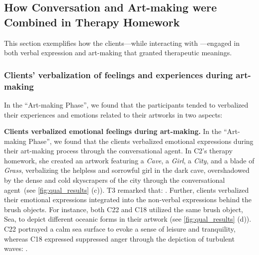 \subsection{How Conversation and Art-making were Combined in Therapy Homework}
This section exemplifies how the clients---while interacting with \name{}---engaged in both verbal expression and art-making that granted therapeutic meanings.



\subsubsection{\textbf{Clients' verbalization of feelings and experiences during art-making}}
In the ``Art-making Phase'', we found that the participants tended to verbalized their experiences and emotions related to their artworks in two aspects:

\textbf{Clients verbalized emotional feelings during art-making.} 
In the ``Art-making Phase'', we found that the clients verbalized emotional expressions during their art-making process through the conversational agent.
In C2's therapy homework, she created an artwork featuring a \textit{Cave}, a \textit{Girl}, a \textit{City}, and a blade of \textit{Grass}, verbalizing the helpless and sorrowful girl in the dark cave, overshadowed by the dense and cold skyscrapers of the city through the conversational agent~(see \autoref{fig:qual_results} (c)).
T3 remarked that: .
Further, clients verbalized their emotional expressions integrated into the non-verbal expressions behind the brush objects.
For instance, both C22 and C18 utilized the same brush object, Sea, to depict different oceanic forms in their artwork (see \autoref{fig:qual_results} (d)). C22 portrayed a calm sea surface to evoke a sense of leisure and tranquility, whereas C18 expressed suppressed anger through the depiction of turbulent waves: . 


